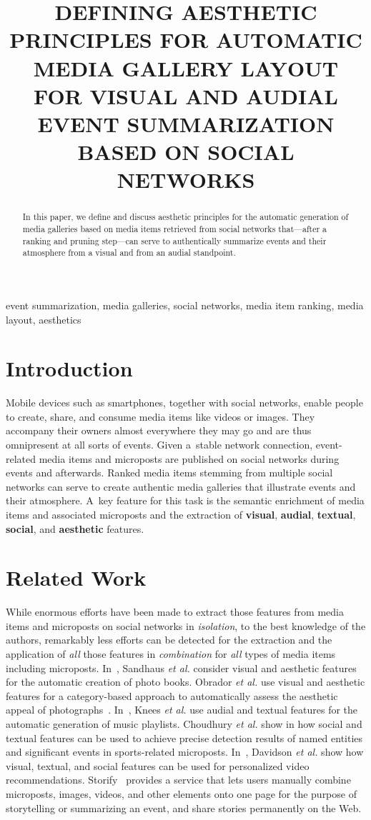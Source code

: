 \documentclass{article}
\title{DEFINING AESTHETIC PRINCIPLES FOR AUTOMATIC MEDIA GALLERY LAYOUT\\
FOR VISUAL AND AUDIAL EVENT SUMMARIZATION BASED ON SOCIAL NETWORKS}
\begin{document}
%
\maketitle
%
\begin{abstract}
In this paper, we define and discuss aesthetic principles
for the automatic generation of media galleries
based on media items retrieved from social networks
that---after a ranking and pruning step---can serve to authentically
summarize events and their atmosphere from a visual
and from an audial standpoint. 
\end{abstract}
%
\begin{keywords}
event summarization, media galleries, social networks,
media item ranking, media layout, aesthetics
\end{keywords}
%
\section{Introduction}
Mobile devices such as smartphones, together with social networks,
enable people to create, share, and consume media items
like videos or images.
They accompany their owners almost everywhere they may go
and are thus omnipresent at all sorts of events.
Given a~stable network connection, event-related media items
and microposts are published on social networks
during events and afterwards.
Ranked media items stemming from multiple social networks
can serve to create authentic media galleries
that illustrate events and their atmosphere.
A~key feature for this task is the semantic enrichment
of media items and associated microposts
and the extraction of \textbf{visual}, \textbf{audial},
\textbf{textual}, \textbf{social}, and \textbf{aesthetic} features.

\section{Related Work}
While enormous efforts have been made to extract those features
from media items and microposts on social networks in \emph{isolation},
to the best knowledge of the authors, remarkably less efforts 
can be detected for the extraction and the application
of \emph{all} those features in \emph{combination}
for \emph{all} types of media items including microposts.
In~\cite{Photo2011}, Sandhaus \emph{et al.} consider visual and
aesthetic features for the automatic creation of photo books.
Obrador \emph{et al.} use visual and aesthetic features
for a category-based approach to automatically assess
the aesthetic appeal of photographs~\cite{Photo2012}.
In~\cite{Playlist2006}, Knees \emph{et al.} use audial and textual
features for the automatic generation of music playlists.
Choudhury \emph{et al.} show in \cite{Sports2011} how social and textual
features can be used to achieve precise detection results 
of named entities and significant events in sports-related microposts.
In~\cite{YouTube2010}, Davidson \emph{et al.} show how visual,
textual, and social features can be used for personalized video recommendations.
Storify~\cite{Storify2011} provides a service that lets users manually combine
microposts, images, videos, and other elements onto one page for the purpose
of storytelling or summarizing an event,
and share stories permanently on the Web.
\end{document}
